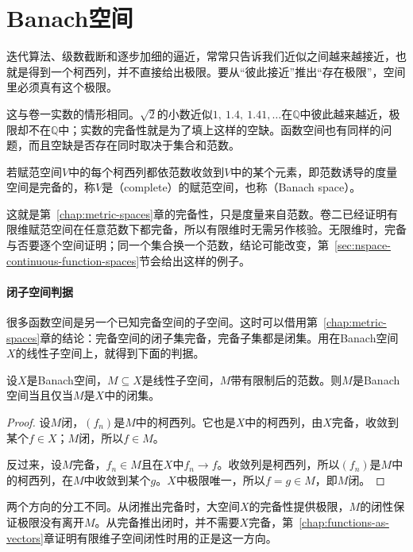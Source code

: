 \section{Banach空间}
\label{sec:nspace-banach-spaces}

迭代算法、级数截断和逐步加细的逼近，常常只告诉我们近似之间越来越接近，也就是得到一个柯西列，并不直接给出极限。要从“彼此接近”推出“存在极限”，空间里必须真有这个极限。

这与卷一实数的情形相同。$\sqrt2$的小数近似$1,\ 1.4,\ 1.41,\ldots$在$\mathbb Q$中彼此越来越近，极限却不在$\mathbb Q$中；实数的完备性就是为了填上这样的空缺。函数空间也有同样的问题，而且空缺是否存在同时取决于集合和范数。

\begin{definition}[Banach空间]
\label{def:nspace-banach}
若赋范空间$V$中的每个柯西列都依范数收敛到$V$中的某个元素，即范数诱导的度量空间是完备的，称$V$是（complete）的赋范空间，也称（Banach space）。
\end{definition}

这就是第~\ref{chap:metric-spaces}章的完备性，只是度量来自范数。卷二已经证明有限维赋范空间在任意范数下都完备，所以有限维时无需另作核验。无限维时，完备与否要逐个空间证明；同一个集合换一个范数，结论可能改变，第~\ref{sec:nspace-continuous-function-spaces}节会给出这样的例子。

\paragraph{闭子空间判据}
很多函数空间是另一个已知完备空间的子空间。这时可以借用第~\ref{chap:metric-spaces}章的结论：完备空间的闭子集完备，完备子集都是闭集。用在Banach空间$X$的线性子空间上，就得到下面的判据。

\begin{theorem}[闭子空间判据]
\label{thm:nspace-closed-subspace}
设$X$是Banach空间，$M\subseteq X$是线性子空间，$M$带有限制后的范数。则$M$是Banach空间当且仅当$M$是$X$中的闭集。
\end{theorem}

\begin{proof}
设$M$闭，$(f_n)$是$M$中的柯西列。它也是$X$中的柯西列，由$X$完备，收敛到某个$f\in X$；$M$闭，所以$f\in M$。

反过来，设$M$完备，$f_n\in M$且在$X$中$f_n\to f$。收敛列是柯西列，所以$(f_n)$是$M$中的柯西列，在$M$中收敛到某个$g$。$X$中极限唯一，所以$f=g\in M$，即$M$闭。
\end{proof}

两个方向的分工不同。从闭推出完备时，大空间$X$的完备性提供极限，$M$的闭性保证极限没有离开$M$。从完备推出闭时，并不需要$X$完备，第~\ref{chap:functions-as-vectors}章证明有限维子空间闭性时用的正是这一方向。

